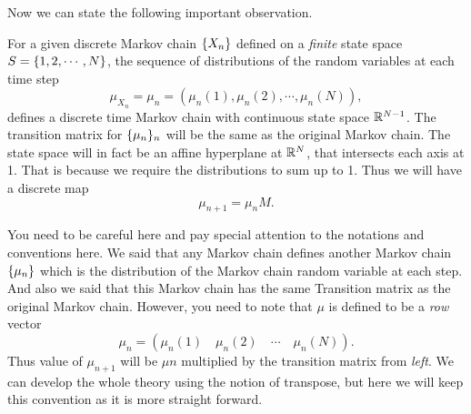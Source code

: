 Now we can state the following important observation.
\begin{observation}
	For a given discrete Markov chain $ \{X_n\} $ defined on a \emph{finite} state space $ S = \{1,2,\cdots, N\} $, the sequence of distributions of the random variables at each time step
	\[ \mu_{X_n} = \mu_n = (\mu_n(1),\mu_n(2),\cdots,\mu_n(N)), \]
	defines a discrete time Markov chain with continuous state space $ \mathbb{R}^{N-1} $. The transition matrix for $ \{\mu_n\}_n $ will be the same as the original Markov chain. The state space will in fact be an affine hyperplane at $ \mathbb{R}^N $, that intersects each axis at 1. That is because we require the distributions to sum up to 1. Thus we will have a discrete map 
	\[  \mu_{n+1} = \mu_n M.  \]
\end{observation}

\begin{observation}
	You need to be careful here and pay special attention to the notations and conventions here. We said that any Markov chain defines another Markov chain $ \{\mu_n\} $ which is the distribution of the Markov chain random variable at each step. And also we said that this Markov chain has the same Transition matrix as the original Markov chain. However, you need to note that $ \mu $ is defined to be a \emph{row} vector 
	\[  \mu_n = (\mu_n(1) \quad \mu_n(2) \quad \cdots \quad \mu_n(N)).  \]
	Thus value of $ \mu_{n+1} $ will be $ \mu{n} $ multiplied by the transition matrix from \emph{left}. We can develop the whole theory using the notion of transpose, but here we will keep this convention as it is more straight forward. 
\end{observation}


